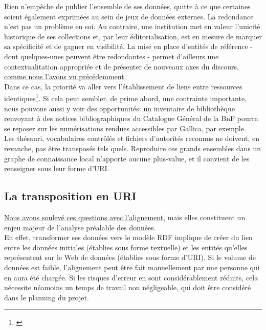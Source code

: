 \documentclass[a4paper,12pt,twoside]{book}
\begin{document}
Rien n'empêche de publier l'ensemble de ses données, quitte à ce que certaines soient également exprimées au sein de jeux de données externes. La redondance n'est pas un problème en soi. Au contraire, une institution met en valeur l'unicité historique de ses collections et, par leur éditorialisation, est en mesure de marquer sa spécificité et de gagner en visibilité. La mise en place d'entités de référence - dont quelques-unes peuvent être redondantes - permet d'ailleurs une contextualitation appropriée et de présenter de nouveaux axes du discours, \hyperref[2-referentiel-int]{comme nous l'avons vu précédemment}. \\

Dans ce cas, la priorité va aller vers l'établissement de liens entre ressources identiques\footnote{\cite[p.~69-70]{bermesWebSemantiqueBibliotheque2013}}. Si cela peut sembler, de prime abord, une contrainte importante, nous pouvons aussi y voir des opportunités: un inventaire de bibliothèque renvoyant à des notices bibliographiques du Catalogue Général de la BnF pourra se reposer sur les numérisations rendues accessibles par Gallica, par exemple.\\

Les thésauri, vocabulaires contrôlés et fichiers d'autorités reconnus ne doivent, en revanche, pas être transposés tels quels. Reproduire ces grands ensembles dans un graphe de connaissance local n'apporte aucune plus-value, et il convient de les renseigner sous leur forme d'URI.\\


\subsection{La transposition en URI}

\hyperref[2-alignement-AAFS]{Nous avons soulevé ces questions avec l'alignement}, mais elles constituent un enjeu majeur de l'analyse préalable des données.\\

En effet, transformer ses données vers le modèle RDF implique de créer du lien entre les données initiales (établies sous forme textuelle) et les entités qu'elles représentent sur le Web de données (établies sous forme d'URI). Si le volume de données est faible, l'alignement peut être fait manuellement par une personne qui en aura été chargée. Si les risques d'erreur en sont considérablement réduits, cela nécessite néamoins un temps de travail non négligeable, qui doit être considéré dans le planning du projet.\\
\end{document}
